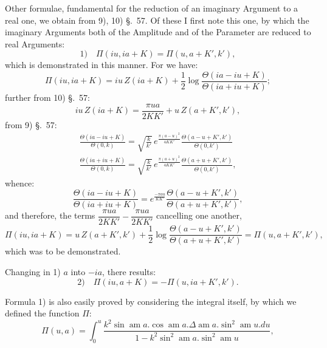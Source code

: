 \documentclass{article}
\begin{document}
Other formulae, fundamental for the reduction of an imaginary Argument to a real one, we obtain from 9), 10) §.\ 57. Of these I first note this one, by which the imaginary Arguments both of the Amplitude and of the Parameter are reduced to real Arguments:
\[
\text{1)}\quad \Pi(iu,ia+K)=\Pi(u,a+K',k'),
\]
which is demonstrated in this manner. For we have:
\[
\Pi(iu,ia+K)=iu\,Z(ia+K)+\frac{1}{2}\log\frac{\Theta(ia-iu+K)}{\Theta(ia+iu+K)};
\]
further from 10) §.\ 57:
\[
iu\,Z(ia+K)=\frac{\pi ua}{2KK'}+u\,Z(a+K',k'),
\]
from 9) §.\ 57:
\[
\begin{gathered}
\frac{\Theta(ia-iu+K)}{\Theta(0,k)}=\sqrt{\frac{k}{k'}}\,e^{\frac{\pi(a-u)^{2}}{4KK'}}\frac{\Theta(a-u+K',k')}{\Theta(0,k')}\\[1.5ex]
\frac{\Theta(ia+iu+K)}{\Theta(0,k)}=\sqrt{\frac{k}{k'}}\,e^{\frac{\pi(a+u)^{2}}{4KK'}}\frac{\Theta(a+u+K',k')}{\Theta(0,k')},
\end{gathered}
\]
whence:
\[
\frac{\Theta(ia-iu+K)}{\Theta(ia+iu+K)}=e^{\frac{-\pi au}{KK'}}\frac{\Theta(a-u+K',k')}{\Theta(a+u+K',k')},
\]
and therefore, the terms $\dfrac{\pi ua}{2KK'}-\dfrac{\pi ua}{2KK'}$ cancelling one another,
\[
\Pi(iu,ia+K)=u\,Z(a+K',k')+\frac{1}{2}\log\frac{\Theta(a-u+K',k')}{\Theta(a+u+K',k')}=\Pi(u,a+K',k'),
\]
which was to be demonstrated.

Changing in 1) $a$ into $-ia$, there results:
\[
\text{2)}\quad \Pi(iu,a+K)=-\Pi(u,ia+K',k').
\]

Formula 1) is also easily proved by considering the integral itself, by which we defined the function $\Pi$:
\[
\Pi(u,a)=\int_{0}^{u}\frac{k^{2}\sin\operatorname{am}a.\cos\operatorname{am}a.\Delta\operatorname{am}a.\sin^{2}\operatorname{am}u.du}{1-k^{2}\sin^{2}\operatorname{am}a.\sin^{2}\operatorname{am}u},
\]
\end{document}
